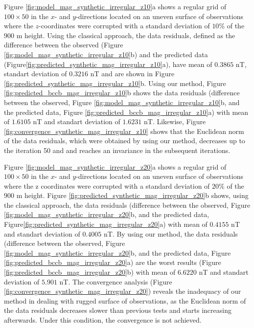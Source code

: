 Figure \ref{fig:model_mag_synthetic_irregular_z10}a shows a regular grid of $100 \times 50$ in the $x$- and $y$-directions located on an uneven surface of observations where  the $z$-coordinates were corrupted with a standard deviation of  $10\%$ of the $900$ m height.  
Using the classical approach, the data residuals, defined as the difference between the observed 
(Figure \ref{fig:model_mag_synthetic_irregular_z10}b) and the predicted data  (Figure\ref{fig:predicted_synthetic_mag_irregular_z10}a), have mean of $0.3865$ nT, standart deviation of $0.3216$ nT and are shown in Figure \ref{fig:predicted_synthetic_mag_irregular_z10}b. 
Using our method, Figure \ref{fig:predicted_bccb_mag_irregular_z10}b shows the data residuals 
(difference between the observed, Figure \ref{fig:model_mag_synthetic_irregular_z10}b, and the predicted data, Figure \ref{fig:predicted_bccb_mag_irregular_z10}a) with mean of $1.6105$ nT and 
standart deviation of $1.6231$ nT. 
Likewise,  Figure \ref{fig:convergence_synthetic_mag_irregular_z10}  shows that the Euclidean norm of the data residuals, which were obtained by using our method, decreases up to the iteration 50 and 
and reaches an invariance in the subsequent iterations.  


Figure \ref{fig:model_mag_synthetic_irregular_z20}a shows  a regular grid of $100 \times 50$ in the $x$- and $y$-directions located on an uneven surface of observations where  the z coordinates were corrupted with a standard deviation of  $20\%$ of the $900$ m height.  
Figure \ref{fig:predicted_synthetic_mag_irregular_z20}b shows, using the classical approach, the data residuals (difference between the observed, Figure \ref{fig:model_mag_synthetic_irregular_z20}b, and the predicted data, Figure\ref{fig:predicted_synthetic_mag_irregular_z20}a) with  mean of $0.4155$ nT and 
standart deviation of $0.4005$ nT. 
By using our method,  the data residuals (difference  between the observed,
Figure \ref{fig:model_mag_synthetic_irregular_z20}b, and the predicted data,
Figure \ref{fig:predicted_bccb_mag_irregular_z20}a) are the worst results
(Figure \ref{fig:predicted_bccb_mag_irregular_z20}b)
with mean of $6.6220$ nT and standart deviation of $5.901$ nT.
The convergence analysis (Figure \ref{fig:convergence_synthetic_mag_irregular_z20})
reveals the inadequacy of our method in dealing with rugged  surface of observations, as 
the Euclidean norm of the data residuals decreases slower than previous tests and starts increasing afterwards. 
Under this condition, the convergence is not achieved. 


